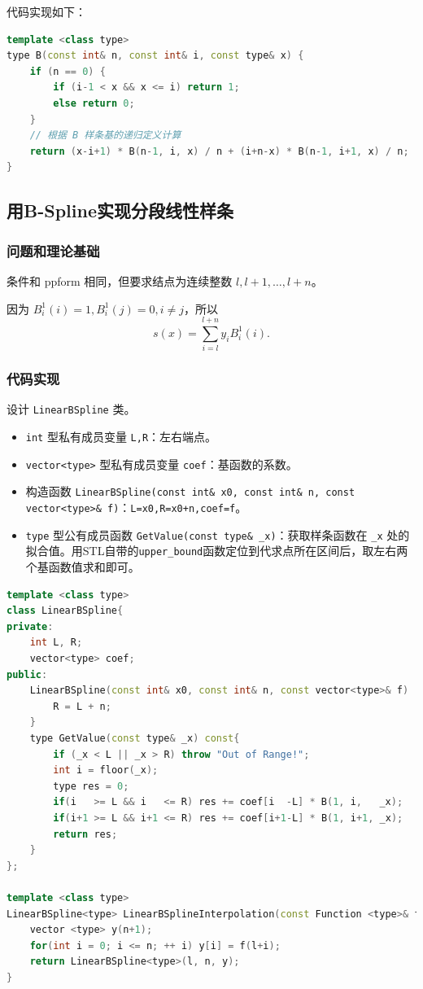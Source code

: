 \documentclass{ctexart}
\begin{document}
代码实现如下：

\begin{lstlisting}[language={c++}]
template <class type>
type B(const int& n, const int& i, const type& x) {
	if (n == 0) {
		if (i-1 < x && x <= i) return 1;
		else return 0;
	}
	// 根据 B 样条基的递归定义计算
	return (x-i+1) * B(n-1, i, x) / n + (i+n-x) * B(n-1, i+1, x) / n;
}
\end{lstlisting}

\subsection{用B-Spline实现分段线性样条}

\subsubsection{问题和理论基础}
条件和 ppform 相同，但要求结点为连续整数 $l,l+1,\dots,l+n$。

因为 $B_i^1(i)=1,B_i^1(j)=0,i\neq j$，所以
\begin{equation}
s(x)=\sum_{i=l}^{l+n}y_iB_i^1(i).
\end{equation}

\subsubsection{代码实现}

设计 \verb|LinearBSpline| 类。

\begin{itemize}
\item \verb|int| 型私有成员变量 \verb|L,R|：左右端点。
\item \verb|vector<type>| 型私有成员变量 \verb|coef|：基函数的系数。
\item 构造函数 \verb|LinearBSpline(const int& x0, const int& n, const vector<type>& f)|：\verb|L=x0,R=x0+n,coef=f|。
\item \verb|type| 型公有成员函数 \verb|GetValue(const type& _x)|：获取样条函数在 \verb|_x| 处的拟合值。用STL自带的\verb|upper_bound|函数定位到代求点所在区间后，取左右两个基函数值求和即可。
\end{itemize}

\begin{lstlisting}[language={c++}]
template <class type>
class LinearBSpline{
private:
	int L, R;
	vector<type> coef;
public:
	LinearBSpline(const int& x0, const int& n, const vector<type>& f) : L(x0), coef(f) {
		R = L + n;
	}
	type GetValue(const type& _x) const{
		if (_x < L || _x > R) throw "Out of Range!";
		int i = floor(_x);
		type res = 0;
		if(i   >= L && i   <= R) res += coef[i  -L] * B(1, i,   _x);
		if(i+1 >= L && i+1 <= R) res += coef[i+1-L] * B(1, i+1, _x);
		return res;
	}
};

template <class type>
LinearBSpline<type> LinearBSplineInterpolation(const Function <type>& f, const int& l, const int& n) {
	vector <type> y(n+1);
	for(int i = 0; i <= n; ++ i) y[i] = f(l+i);
	return LinearBSpline<type>(l, n, y);
}
\end{lstlisting}
\end{document}
